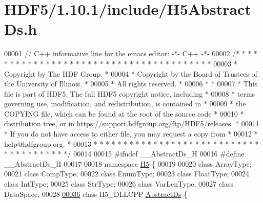 \hypertarget{_h_d_f5_21_810_81_2include_2_h5_abstract_ds_8h_source}{}\section{H\+D\+F5/1.10.1/include/\+H5\+Abstract\+Ds.h}
\label{_h_d_f5_21_810_81_2include_2_h5_abstract_ds_8h_source}

\begin{DoxyCode}
00001 \textcolor{comment}{// C++ informative line for the emacs editor: -*- C++ -*-}
00002 \textcolor{comment}{/* * * * * * * * * * * * * * * * * * * * * * * * * * * * * * * * * * * * * * *}
00003 \textcolor{comment}{ * Copyright by The HDF Group.                                               *}
00004 \textcolor{comment}{ * Copyright by the Board of Trustees of the University of Illinois.         *}
00005 \textcolor{comment}{ * All rights reserved.                                                      *}
00006 \textcolor{comment}{ *                                                                           *}
00007 \textcolor{comment}{ * This file is part of HDF5.  The full HDF5 copyright notice, including     *}
00008 \textcolor{comment}{ * terms governing use, modification, and redistribution, is contained in    *}
00009 \textcolor{comment}{ * the COPYING file, which can be found at the root of the source code       *}
00010 \textcolor{comment}{ * distribution tree, or in https://support.hdfgroup.org/ftp/HDF5/releases.  *}
00011 \textcolor{comment}{ * If you do not have access to either file, you may request a copy from     *}
00012 \textcolor{comment}{ * help@hdfgroup.org.                                                        *}
00013 \textcolor{comment}{ * * * * * * * * * * * * * * * * * * * * * * * * * * * * * * * * * * * * * * */}
00014 
00015 \textcolor{preprocessor}{#ifndef \_\_AbstractDs\_H}
00016 \textcolor{preprocessor}{#define \_\_AbstractDs\_H}
00017 
00018 \textcolor{keyword}{namespace }\hyperlink{namespace_h5}{H5} \{
00019 
00020 \textcolor{keyword}{class }ArrayType;
00021 \textcolor{keyword}{class }CompType;
00022 \textcolor{keyword}{class }EnumType;
00023 \textcolor{keyword}{class }FloatType;
00024 \textcolor{keyword}{class }IntType;
00025 \textcolor{keyword}{class }StrType;
00026 \textcolor{keyword}{class }VarLenType;
00027 \textcolor{keyword}{class }DataSpace;
00028 
\hyperlink{class_h5_1_1_abstract_ds}{00036} \textcolor{keyword}{class }H5\_DLLCPP \hyperlink{class_h5_1_1_abstract_ds}{AbstractDs} \{

\end{DoxyCode}
